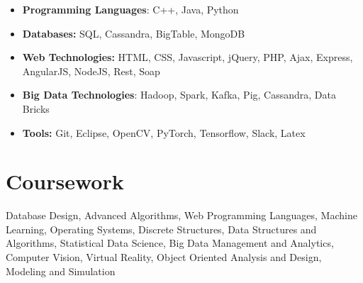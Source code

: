 \documentclass[letterpaper,11pt]{article}
\begin{document}
\begin{itemize}[noitemsep,nolistsep,leftmargin=*]


\item \textbf{Programming Languages}: C++, Java, Python
\item \textbf{Databases:} SQL, Cassandra, BigTable, MongoDB
\item \textbf{Web Technologies:} HTML, CSS, Javascript, jQuery, PHP, Ajax, Express, AngularJS, NodeJS, Rest, Soap
 \item \textbf{Big Data Technologies}: Hadoop, Spark, Kafka, Pig, Cassandra, Data Bricks
\item \textbf{Tools:} Git, Eclipse, OpenCV,  PyTorch, Tensorflow, Slack, Latex
  \end{itemize}
 

  
  
    
   \section{Coursework}
Database Design, Advanced Algorithms, Web Programming Languages, Machine Learning, Operating Systems,  Discrete Structures, Data Structures and Algorithms,  Statistical Data Science, Big Data Management and Analytics, Computer Vision, Virtual Reality, Object Oriented Analysis and Design, Modeling and Simulation
  

  
\end{document}
